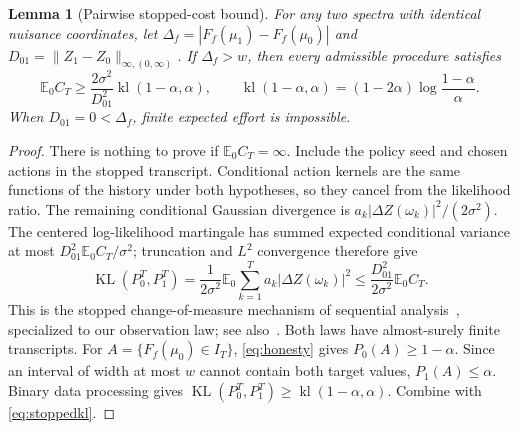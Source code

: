 \documentclass[10pt]{amsart}
\newtheorem{lemma}[theorem]{Lemma}
\theoremstyle{definition}
\theoremstyle{remark}
\newcommand{\E}{\mathbb E}
\newcommand{\KL}{\operatorname{KL}}
\newcommand{\kl}{\operatorname{kl}}
\begin{document}
\begin{lemma}[Pairwise stopped-cost bound]\label{lem:stopped}
For any two spectra with identical nuisance coordinates, let $\Delta_f=|F_f(\mu_1)-F_f(\mu_0)|$ and $D_{01}=\|Z_1-Z_0\|_{\infty,(0,\infty)}$. If $\Delta_f>w$, then every admissible procedure satisfies
\begin{equation}\label{eq:paircost}
 \E_0C_T\ge\frac{2\sigma^2}{D_{01}^2}\kl(1-\alpha,\alpha),\qquad
 \kl(1-\alpha,\alpha)=(1-2\alpha)\log\frac{1-\alpha}{\alpha}.
\end{equation}
When $D_{01}=0<\Delta_f$, finite expected effort is impossible.
\end{lemma}
\begin{proof}
There is nothing to prove if $\E_0C_T=\infty$. Include the policy seed and chosen actions in the stopped transcript. Conditional action kernels are the same functions of the history under both hypotheses, so they cancel from the likelihood ratio. The remaining conditional Gaussian divergence is $a_k|\Delta Z(\omega_k)|^2/(2\sigma^2)$. The centered log-likelihood martingale has summed expected conditional variance at most $D_{01}^2\E_0C_T/\sigma^2$; truncation and $L^2$ convergence therefore give
\begin{equation}\label{eq:stoppedkl}
 \KL(P_0^T,P_1^T)
 =\frac1{2\sigma^2}\E_0\sum_{k=1}^T a_k|\Delta Z(\omega_k)|^2
 \le\frac{D_{01}^2}{2\sigma^2}\E_0C_T.
\end{equation}
This is the stopped change-of-measure mechanism of sequential analysis~\cite[Lemma~1 and Appendix~A]{kaufmann}, specialized to our observation law; see also~\cite{castro}. Both laws have almost-surely finite transcripts. For $A=\{F_f(\mu_0)\in I_T\}$, \eqref{eq:honesty} gives $P_0(A)\ge1-\alpha$. Since an interval of width at most $w$ cannot contain both target values, $P_1(A)\le\alpha$. Binary data processing gives $\KL(P_0^T,P_1^T)\ge\kl(1-\alpha,\alpha)$. Combine with \eqref{eq:stoppedkl}.
\end{proof}
\end{document}
